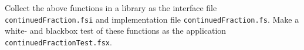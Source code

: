 Collect the above functions in a library as the interface file 
\lstinline[language=console]{continuedFraction.fsi} and implementation file
\lstinline[language=console]{continuedFraction.fs}. Make a white- and
blackbox test of these functions as the application \lstinline[language=console]{continuedFractionTest.fsx}.
